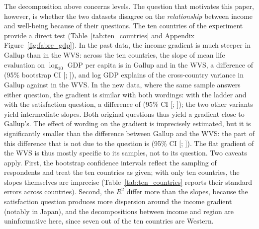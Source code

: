 \documentclass[12pt]{article}
\begin{document}
The decomposition above concerns levels. The question that motivates this paper, however, is whether the two datasets disagree on the \textit{relationship} between income and well-being because of their questions. The ten countries of the experiment provide a direct test (Table~\ref{tab:ten_countries} and Appendix Figure~\ref{fig:fabre_gdp}). In the past data, the income gradient is much steeper in Gallup than in the WVS: across the ten countries, the slope of mean life evaluation on $\log_{10}$ GDP per capita is \slopeTenGallup in Gallup and \slopeTenWVS in the WVS, a difference of \SlopeDiffPast (95\% bootstrap CI [\SlopeDiffPastLow; \SlopeDiffPastHigh]), and log GDP explains \RtwoTenGallup of the cross-country variance in Gallup against \RtwoTenWVS in the WVS. In the new data, where the same sample answers either question, the gradient is similar with both wordings: \slopeTenFabreLadder with the ladder and \slopeTenFabreSatisfaction with the satisfaction question, a difference of \SlopeDiffFabre (95\% CI [\SlopeDiffFabreLow; \SlopeDiffFabreHigh]); the two other variants yield intermediate slopes. %
Both original questions thus yield a gradient close to Gallup's. The effect of wording on the gradient is imprecisely estimated, but it is significantly smaller than the difference between Gallup and the WVS: the part of this difference that is not due to the question is \SlopeDiffinDiff (95\% CI [\SlopeDiffinDiffLow; \SlopeDiffinDiffHigh]). The flat gradient of the WVS is thus mostly specific to its samples, not to its question. %
Two caveats apply. First, the bootstrap confidence intervals reflect the sampling of respondents and treat the ten countries as given; with only ten countries, the slopes themselves are imprecise (Table~\ref{tab:ten_countries} reports their standard errors across countries). 
Second, the $R^2$ differ more than the slopes, because the satisfaction question produces more dispersion around the income gradient (notably in Japan), %
and the decompositions between income and region are uninformative here, since seven out of the ten countries are Western. %
\end{document}
